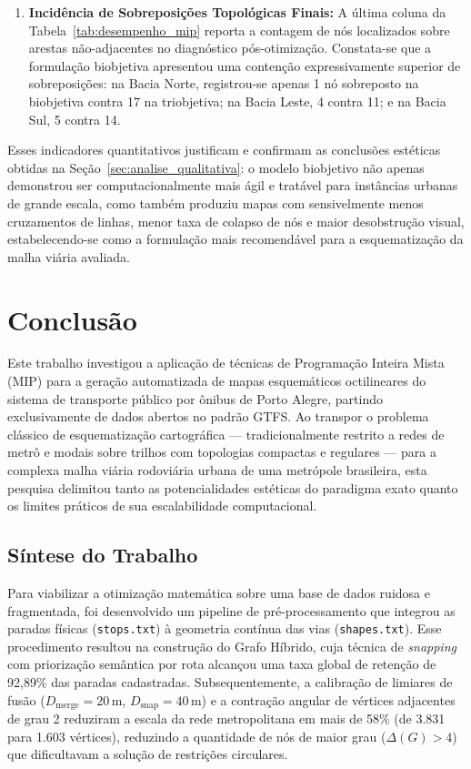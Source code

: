 \documentclass[cic,tc]{infufrgs}
\begin{document}
\begin{enumerate}
    \item \textbf{Incidência de Sobreposições Topológicas Finais:} A última coluna da Tabela~\ref{tab:desempenho_mip} reporta a contagem de nós localizados sobre arestas não-adjacentes no diagnóstico pós-otimização. Constata-se que a formulação biobjetiva apresentou uma contenção expressivamente superior de sobreposições: na Bacia Norte, registrou-se apenas 1 nó sobreposto na biobjetiva contra 17 na triobjetiva; na Bacia Leste, 4 contra 11; e na Bacia Sul, 5 contra 14. 
\end{enumerate}

Esses indicadores quantitativos justificam e confirmam as conclusões estéticas obtidas na Seção~\ref{sec:analise_qualitativa}: o modelo biobjetivo não apenas demonstrou ser computacionalmente mais ágil e tratável para instâncias urbanas de grande escala, como também produziu mapas com sensivelmente menos cruzamentos de linhas, menor taxa de colapso de nós e maior desobstrução visual, estabelecendo-se como a formulação mais recomendável para a esquematização da malha viária avaliada.

\chapter{Conclusão}
\label{cap:conclusao}

Este trabalho investigou a aplicação de técnicas de Programação Inteira Mista (MIP) para a geração automatizada de mapas esquemáticos octilineares do sistema de transporte público por ônibus de Porto Alegre, partindo exclusivamente de dados abertos no padrão GTFS. Ao transpor o problema clássico de esquematização cartográfica — tradicionalmente restrito a redes de metrô e modais sobre trilhos com topologias compactas e regulares — para a complexa malha viária rodoviária urbana de uma metrópole brasileira, esta pesquisa delimitou tanto as potencialidades estéticas do paradigma exato quanto os limites práticos de sua escalabilidade computacional.

\section{Síntese do Trabalho}
\label{sec:sintese_trabalho}

Para viabilizar a otimização matemática sobre uma base de dados ruidosa e fragmentada, foi desenvolvido um pipeline de pré-processamento que integrou as paradas físicas (\texttt{stops.txt}) à geometria contínua das vias (\texttt{shapes.txt}). Esse procedimento resultou na construção do Grafo Híbrido, cuja técnica de \textit{snapping} com priorização semântica por rota alcançou uma taxa global de retenção de 92,89\% das paradas cadastradas. Subsequentemente, a calibração de limiares de fusão ($D_{\text{merge}} = 20\,\text{m}$, $D_{\text{snap}} = 40\,\text{m}$) e a contração angular de vértices adjacentes de grau 2 reduziram a escala da rede metropolitana em mais de 58\% (de 3.831 para 1.603 vértices), reduzindo a quantidade de nós de maior grau ($\Delta(G) > 4$) que dificultavam a solução de restrições circulares.
\end{document}
